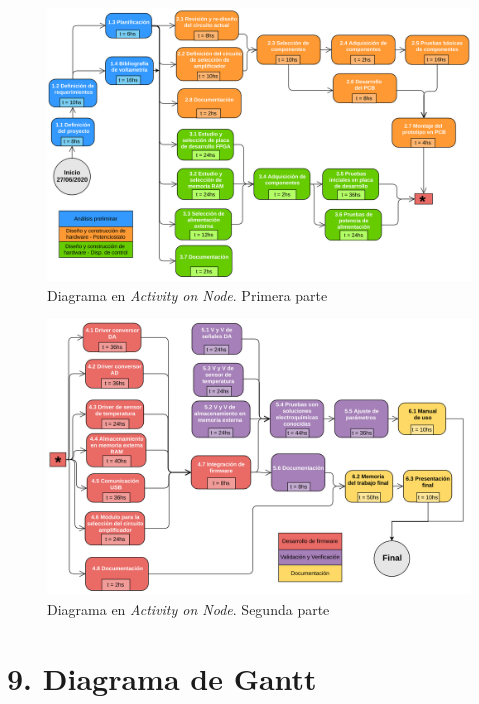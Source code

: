 \documentclass[11pt]{charter}
\begin{document}
\begin{figure}[H]
\centering 
\includegraphics[width=1\textwidth]{./Figuras/Activity-On-Node1.png}
\caption{Diagrama en \textit{Activity on Node}. Primera parte}
\label{fig:AoN1}
\end{figure}

\begin{figure}[H]
\centering 
\includegraphics[width=1\textwidth]{./Figuras/Activity-On-Node2.png}
\caption{Diagrama en \textit{Activity on Node}. Segunda parte}
\label{fig:AoN2}
\end{figure}

\section{9. Diagrama de Gantt}
\label{sec:gantt}
\end{document}
